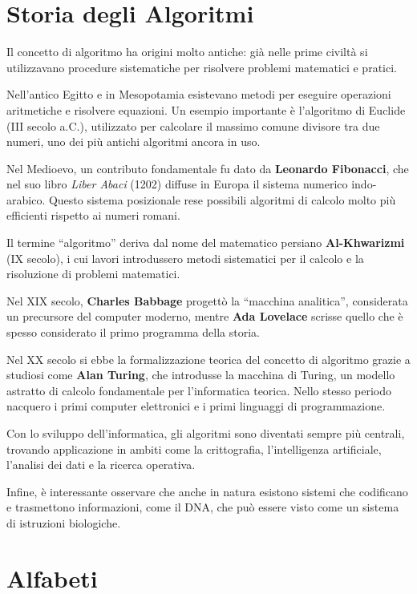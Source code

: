 \documentclass[a4paper,12pt]{article}
\let\oldsection\section
\renewcommand{\section}{\clearpage\oldsection}
\begin{document}
\section{Storia degli Algoritmi}

Il concetto di algoritmo ha origini molto antiche: già nelle prime civiltà si utilizzavano procedure sistematiche per risolvere problemi matematici e pratici.

Nell’antico Egitto e in Mesopotamia esistevano metodi per eseguire operazioni aritmetiche e risolvere equazioni. Un esempio importante è l’algoritmo di Euclide (III secolo a.C.), utilizzato per calcolare il massimo comune divisore tra due numeri, uno dei più antichi algoritmi ancora in uso.

Nel Medioevo, un contributo fondamentale fu dato da \textbf{Leonardo Fibonacci}, che nel suo libro \textit{Liber Abaci} (1202) diffuse in Europa il sistema numerico indo-arabico. Questo sistema posizionale rese possibili algoritmi di calcolo molto più efficienti rispetto ai numeri romani.

Il termine “algoritmo” deriva dal nome del matematico persiano \textbf{Al-Khwarizmi} (IX secolo), i cui lavori introdussero metodi sistematici per il calcolo e la risoluzione di problemi matematici.

Nel XIX secolo, \textbf{Charles Babbage} progettò la “macchina analitica”, considerata un precursore del computer moderno, mentre \textbf{Ada Lovelace} scrisse quello che è spesso considerato il primo programma della storia.

Nel XX secolo si ebbe la formalizzazione teorica del concetto di algoritmo grazie a studiosi come \textbf{Alan Turing}, che introdusse la macchina di Turing, un modello astratto di calcolo fondamentale per l’informatica teorica. Nello stesso periodo nacquero i primi computer elettronici e i primi linguaggi di programmazione.

Con lo sviluppo dell’informatica, gli algoritmi sono diventati sempre più centrali, trovando applicazione in ambiti come la crittografia, l’intelligenza artificiale, l’analisi dei dati e la ricerca operativa.

Infine, è interessante osservare che anche in natura esistono sistemi che codificano e trasmettono informazioni, come il DNA, che può essere visto come un sistema di istruzioni biologiche.
\section{Alfabeti}
\end{document}
